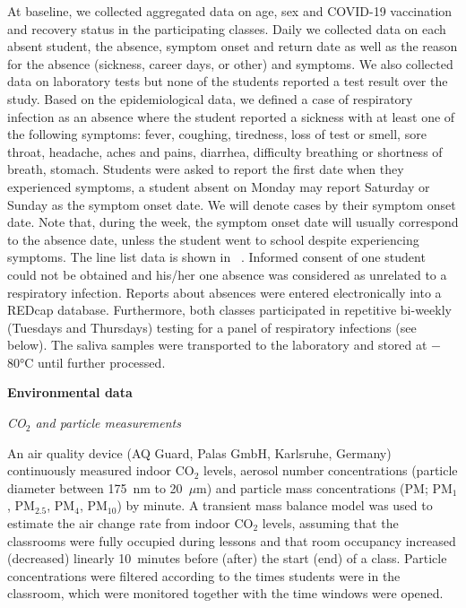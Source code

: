 \documentclass[fleqn,11pt]{wlscirep}
\begin{document}
\noindent At baseline, we collected aggregated data on age, sex and COVID-19 vaccination and recovery status in the participating classes. Daily we collected data on each absent student, \ie the absence, symptom onset and return date as well as the reason for the absence (sickness, career days,  or other) and symptoms. We also collected data on laboratory tests but none of the students reported a test result over the study. Based on the epidemiological data, we defined a case of respiratory infection as an absence where the student reported a sickness with at least one of the following symptoms: fever, coughing, tiredness, loss of test or smell, sore throat, headache, aches and pains, diarrhea, difficulty breathing or shortness of breath, stomach. Students were asked to report the first date when they experienced symptoms, \eg a student absent on Monday may report Saturday or Sunday as the symptom onset date. We will denote cases by their symptom onset date. Note that, during the week, the symptom onset date will usually correspond to the absence date, unless the student went to school despite experiencing symptoms. The line list data is shown in \supp~. Informed consent of one student could not be obtained and his/her one absence was considered as unrelated to a respiratory infection. Reports about absences were entered electronically into a REDcap database\cite{Harris2009,Harris2019}. Furthermore, both classes participated in repetitive bi-weekly (Tuesdays and Thursdays) testing for a panel of respiratory infections (see  below). The saliva samples were transported to the laboratory and stored at $-$80°C until further processed\cite{Galar2021,To2019,Huber2021}. \medskip

\noindent\textbf{Environmental data} \smallskip

\noindent \emph{CO$_2$ and particle measurements} 

\noindent An air quality device (AQ Guard, Palas GmbH, Karlsruhe, Germany) continuously measured indoor CO$_2$ levels, aerosol number concentrations (particle diameter between 175~nm to 20~$\mu$m) and particle mass concentrations (PM; PM$_1$, PM$_{2.5}$, PM$_4$, PM$_{10}$) by minute. A transient mass balance model was used to estimate the air change rate from indoor CO$_2$ levels\cite{Batterman2017IJERPH}, assuming that the classrooms were fully occupied during lessons and that room occupancy increased (decreased) linearly 10~minutes before (after) the start (end) of a class. Particle concentrations were filtered according to the times students were in the classroom, which were monitored together with the time windows were opened. \medskip
\end{document}
